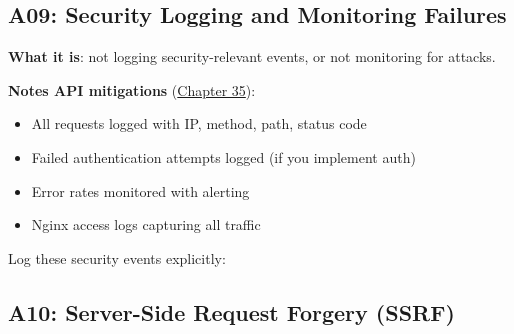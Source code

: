 \subsection*{A09: Security Logging and Monitoring Failures}\label{38-security:a09-security-logging-and-monitoring-failures}

\textbf{What it is}: not logging security-relevant events, or not monitoring for attacks.

\textbf{Notes API mitigations} (\hyperref[ch:35-observability]{Chapter 35}):

\begin{itemize}
\tightlist
\item
  All requests logged with IP, method, path, status code
\item
  Failed authentication attempts logged (if you implement auth)
\item
  Error rates monitored with alerting
\item
  Nginx access logs capturing all traffic
\end{itemize}

\noindent{}Log these security events explicitly:

\begin{codebox}[short]

\begin{Shaded}
\begin{Highlighting}[]
 \NormalTok{:}
        \NormalTok{,}
\OperatorTok{=}\NormalTok{\{}
            \NormalTok{),}
\NormalTok{        \},}
\NormalTok{    )}
    \NormalTok{: }\NormalTok{\}), }
\end{Highlighting}
\end{Shaded}

\end{codebox}

\subsection*{A10: Server-Side Request Forgery (SSRF)}\label{38-security:a10-server-side-request-forgery-ssrf}


